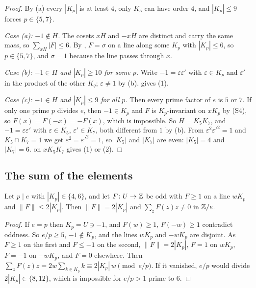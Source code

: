 \begin{proof}
By (a) every $|K_{p}|$ is at least $4$, only $K_{5}$ can have
order $4$, and $|K_{p}|\le9$ forces $p\in\{5,7\}$.

\emph{Case (a): $-1\notin H$.} The cosets $xH$ and $-xH$ are distinct and
carry the same mass, so $\sum_{xH}|F|\le6$. By , $F=\sigma$ on
a line along some $K_{p}$ with $|K_{p}|\le6$, so $p\in\{5,7\}$, and
$\sigma=1$ because the line passes through $x$.

\emph{Case (b): $-1\in H$ and $|K_{p}|\ge10$ for some $p$.} Write
$-1=\varepsilon\varepsilon'$ with $\varepsilon\in K_{p}$ and $\varepsilon'$
in the product of the other $K_{q}$; $\varepsilon\ne1$ by (b).
 gives (1).

\emph{Case (c): $-1\in H$ and $|K_{p}|\le9$ for all $p$.} Then every prime
factor of $e$ is $5$ or $7$. If only one prime $p$ divides $e$, then $-1\in
K_{p}$ and $F$ is $K_{p}$-invariant on $xK_{p}$ by (S4), so
$F(x)=F(-x)=-F(x)$, which is impossible. So $H=K_{5}K_{7}$, and
$-1=\varepsilon\varepsilon'$ with $\varepsilon\in K_{5}$, $\varepsilon'\in
K_{7}$, both different from $1$ by (b). From
$\varepsilon^{2}\varepsilon'^{2}=1$ and $K_{5}\cap K_{7}=1$ we get
$\varepsilon^{2}=\varepsilon'^{2}=1$, so $|K_{5}|$ and $|K_{7}|$ are even:
$|K_{5}|=4$ and $|K_{7}|=6$.  on $xK_{5}K_{7}$ gives (1) or
(2).
\end{proof}

\subsection{The sum of the elements}

\begin{lemma}\label{lem:killline}
Let $p\mid e$ with $|K_{p}|\in\{4,6\}$, and let $F\colon U\to\mathbb{Z}$ be odd with
$F\ge1$ on a line $wK_{p}$ and $\|F\|\le2|K_{p}|$. Then $\|F\|=2|K_{p}|$ and
$\sum_{z}F(z)z\ne0$ in $\mathbb{Z}/e$.
\end{lemma}

\begin{proof}
If $e=p$ then $K_{p}=U\ni-1$, and $F(w)\ge1$, $F(-w)\ge1$ contradict
oddness. So $e/p\ge5$, $-1\notin K_{p}$, and the lines $wK_{p}$ and
$-wK_{p}$ are disjoint. As $F\ge1$ on the first and $F\le-1$ on the second,
$\|F\|=2|K_{p}|$, $F=1$ on $wK_{p}$, $F=-1$ on $-wK_{p}$, and $F=0$
elsewhere. Then $\sum_{z}F(z)z=2w\sum_{k\in K_{p}}k\equiv2|K_{p}|\,w\pmod
{e/p}$. If it vanished, $e/p$ would divide $2|K_{p}|\in\{8,12\}$, which is
impossible for $e/p>1$ prime to $6$.
\end{proof}

